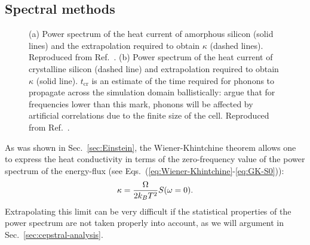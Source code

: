 \begin{LEtext}
\subsection{Spectral methods}  \label{sec:spectral-methods}
\begin{figure}[!tb]
    \begin{center}
        \hfill
    \end{center}
	\caption{
	(a) Power spectrum of the heat current of amorphous silicon (solid lines) and the extrapolation required to obtain $\kappa$ (dashed lines). Reproduced from Ref.~\cite{Lee1991}. 
	(b) Power spectrum of the heat current of crystalline silicon (dashed line) and extrapolation required to obtain $\kappa$ (solid line). $t_\mathrm{cr}$ is an estimate of the time required for phonons to propagate across the simulation domain ballistically: \citet{Volz2000} argue that for frequencies lower than this mark, phonons will be affected by artificial correlations due to the finite size of the cell. Reproduced from Ref.~\cite{Volz2000}. 
	} \label{fig:psd-expfit-examples}
\end{figure}
As was shown in Sec.~\ref{sec:Einstein}, the Wiener-Khintchine theorem allows one to express the heat conductivity in terms of the zero-frequency value of the power spectrum of the energy-flux (see Eqs.~(\ref{eq:Wiener-Khintchine}-\ref{eq:GK-S0})):
\begin{equation}
    \kappa = \frac{\rOmega}{2k_B T^2} S (\omega=0). \label{eq:kappa-S0}
\end{equation}
Extrapolating this limit can be very difficult if the statistical properties of the power spectrum are not taken properly into account, as we will argument in Sec.~\ref{sec:cepstral-analysis}.


\end{LEtext}
